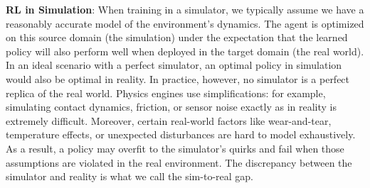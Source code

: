 \textbf{RL in Simulation}: When training in a simulator, we typically assume we have a reasonably accurate model of the environment’s dynamics. The agent is optimized on this source domain (the simulation) under the expectation that the learned policy will also perform well when deployed in the target domain (the real world). In an ideal scenario with a perfect simulator, an optimal policy in simulation would also be optimal in reality. In practice, however, no simulator is a perfect replica of the real world. Physics engines use simplifications: for example, simulating contact dynamics, friction, or sensor noise exactly as in reality is extremely difficult. Moreover, certain real-world factors like wear-and-tear, temperature effects, or unexpected disturbances are hard to model exhaustively. As a result, a policy may overfit to the simulator’s quirks and fail when those assumptions are violated in the real environment. The discrepancy between the simulator and reality is what we call the sim-to-real gap.

